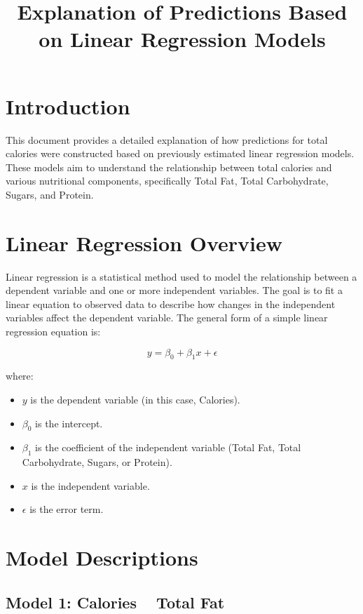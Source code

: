 \documentclass{article}
\title{Explanation of Predictions Based on Linear Regression Models}
\date{}
\begin{document}
\maketitle

\section*{Introduction}

This document provides a detailed explanation of how predictions for total calories were constructed based on previously estimated linear regression models. These models aim to understand the relationship between total calories and various nutritional components, specifically Total Fat, Total Carbohydrate, Sugars, and Protein.

\section*{Linear Regression Overview}

Linear regression is a statistical method used to model the relationship between a dependent variable and one or more independent variables. The goal is to fit a linear equation to observed data to describe how changes in the independent variables affect the dependent variable. The general form of a simple linear regression equation is:

\[
y = \beta_0 + \beta_1x + \epsilon
\]

where:
\begin{itemize}
    \item $y$ is the dependent variable (in this case, Calories).
    \item $\beta_0$ is the intercept.
    \item $\beta_1$ is the coefficient of the independent variable (Total Fat, Total Carbohydrate, Sugars, or Protein).
    \item $x$ is the independent variable.
    \item $\epsilon$ is the error term.
\end{itemize}

\section*{Model Descriptions}

\subsection*{Model 1: Calories ~ Total Fat}
\end{document}
